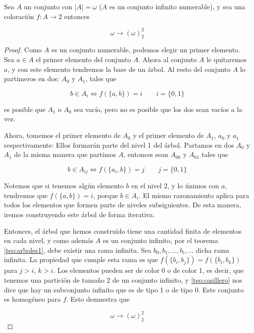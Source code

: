 \begin{teo}\label{teo:omega1}
    Sea $A$ un conjunto con $|A| = \omega$ ($A$ es un conjunto infinito numerable), y sea una coloración $f: A \rightarrow 2$ entonces
    
    \[
    \omega \rightarrow (\omega)_2^2
    \]
\end{teo}

\begin{proof}
    Como $A$ es un conjunto numerable, podemos elegir un primer elemento. Sea $a \in A$ el primer elemento del conjunto $A$. Ahora al conjunto $A$ le quitaremos $a$, y con este elemento tendremos la base de un árbol. Al resto del conjunto $A$ lo partimeros en dos: $A_0$ y $A_1$, tales que
    
    \[
    b \in A_i \iff f\left(\{a,b\}\right) = i \qquad i = \{0,1\}
    \]
    
    \noindent es posible que $A_1$ o $A_0$ sea vacío, pero no es posible que los dos sean vacíos a la vez.
    
    Ahora, tomemos el primer elemento de $A_0$ y el primer elemento de $A_1$, $a_0$ y $a_1$ respectivamente: Ellos formarán parte del nivel 1 del árbol. Partamos en dos $A_0$ y $A_1$ de la misma manera que partimos $A$, entonces sean $A_{00}$ y $A_{01}$ tales que
    
    \[
    b \in A_{ij} \iff f\left(\{a_i,b\}\right) = j \qquad j = \{0,1\}
    \]
    
    Notemos que si tenemos algún elemento $b$ en el nivel 2, y lo únimos con $a$, tendremos que $f(\{a,b\}) = i$, porque $b \in A_i$. El mismo razonamiento aplica para todos los elementos que formen parte de niveles subsiguientes. De esta manera, iremos construyendo este árbol de forma iterativa.
    
    Entonces, el árbol que hemos construído tiene una cantidad finita de elementos en cada nivel, y como además $A$ es un conjunto infinito, por el teorema \ref{teo:arboles1}, debe existir una rama infinita. Sea $b_0, b_1, \dots, b_i, \dots$ dicha rama infinita. La propiedad que cumple esta rama es que $f(\{b_i,b_j\}) = f(\{b_i,b_k\})$ para $j > i$, $k > i$. Los elementos pueden ser de color 0 o de color 1, es decir, que tenemos una partición de tamaño 2 de un conjunto infinito, y \ref{teo:casillero} nos dice que hay un subconjunto infinito que es de tipo 1 o de tipo 0. Este conjunto es homogéneo para $f$. Esto demuestra que
    
    \[
    \omega \rightarrow (\omega)_2^2
    \]
\end{proof}

